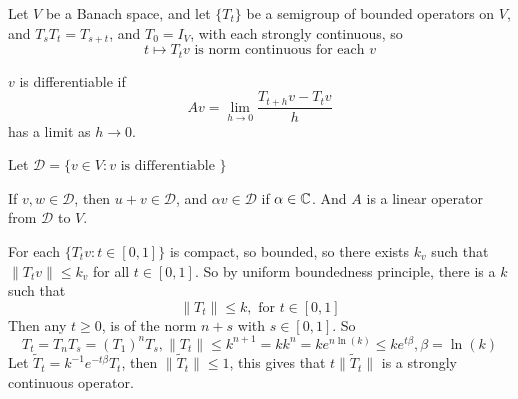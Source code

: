 Let $V$ be a Banach space, and let $\{T_t\}$ be a semigroup of bounded operators on $V$, and $T_sT_t=T_{s+t}$, and $T_0=I_V$, with each strongly continuous, so
\begin{equation*}
    t\mapsto T_tv \text{ is norm continuous for each }v
\end{equation*}
\begin{definition}
    $v$ is differentiable if 
    \begin{equation*}
        Av=\lim_{h\to 0}\frac{T_{t+h}v-T_tv}{h}
    \end{equation*}
    has a limit as $h\to 0$.
\end{definition}
Let $\mathcal{D}=\{v\in V: v \text{ is differentiable }\}$ 
\begin{definition}
    If $v, w\in\mathcal{D}$, then $u+v\in\mathcal{D}$, and $\alpha v\in\mathcal{D}$ if $\alpha\in\mathbb{C}$. And $A$ is a linear operator from $\mathcal{D}$ to $V$.
\end{definition}

For each $\{T_tv:t\in [0,1]\}$ is compact, so bounded, so there exists $k_v$ such that $\|T_tv\|\leq k_v$ for all $t\in [0,1]$. So by uniform boundedness principle, there is a $k$ such that
\begin{equation*}
    \|T_t\|\leq k, \text{ for } t\in [0,1]
\end{equation*}
Then any $t\geq 0$, is of the norm $n+s$ with $s\in [0,1]$. So
\begin{equation*}
    T_t=T_nT_s=(T_1)^nT_s, \|T_t\|\leq k^{n+1}=kk^n=ke^{n\ln(k)}\leq ke^{t\beta}, \beta=\ln(k)
\end{equation*}
Let $\tilde{T}_t=k^{-1}e^{-t\beta}T_t$, then $\|\tilde{T}_t\|\leq 1$, this gives that $t\|\tilde{T}_t\|$ is a strongly continuous operator.

